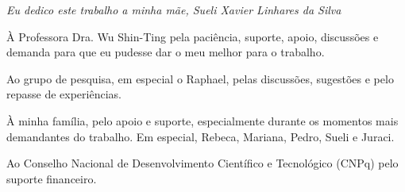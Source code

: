 \documentclass[
    12pt,                %
    oneside,            %
    a4paper,            %
    english,            %
    french,                %
    spanish,            %
    brazil                %
    ]{abntex2}
\begin{document}
\begin{dedicatoria}
   \vspace*{\fill}
   \centering
   \noindent
   \textit{Eu dedico este trabalho a minha mãe, Sueli Xavier Linhares da Silva} \vspace*{\fill}
\end{dedicatoria}

\begin{agradecimentos}
    À Professora Dra. Wu Shin-Ting pela paciência, suporte, apoio, discussões e demanda para que eu pudesse dar o meu melhor para o trabalho.
    
    Ao grupo de pesquisa, em especial o Raphael, pelas discussões, sugestões e pelo repasse de experiências.
    
    À minha família, pelo apoio e suporte, especialmente durante os momentos mais demandantes do trabalho. Em especial, Rebeca, Mariana, Pedro, Sueli e Juraci.
    
    Ao Conselho Nacional de Desenvolvimento Científico  e Tecnológico (CNPq) pelo suporte financeiro.
\end{agradecimentos}


\end{document}
